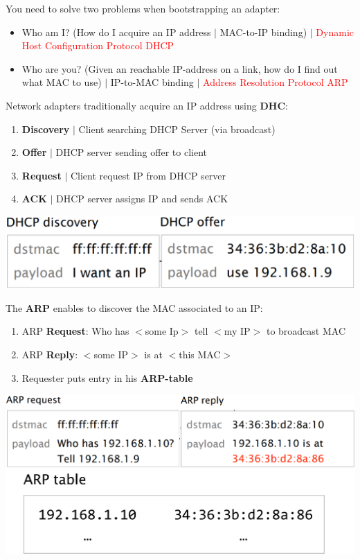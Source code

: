 \documentclass[a4paper, fontsize=8pt, landscape, DIV=1]{scrartcl}
\begin{document}
\begin{multicols*}{4}
\begin{enumerate}[noitemsep]
   			\end{enumerate} 
   			You need to solve two problems when bootstrapping an adapter:
   			\begin{itemize}[noitemsep]
   				\item Who am I? (How do I acquire an IP address $\vert$ MAC-to-IP binding) $\vert$ \textcolor{Red}{Dynamic Host Configuration Protocol DHCP}
   				\item Who are you? (Given an reachable IP-address on a link, how do I find out what MAC to use) $\vert$ IP-to-MAC binding $\vert$ \textcolor{Red}{Address Resolution Protocol ARP}
   			\end{itemize}
   			Network adapters traditionally acquire an IP address using \textbf{DHC}:
   			\begin{enumerate}[noitemsep]
   				\item \textbf{Discovery} $\vert$ Client searching DHCP Server (via broadcast)
   				\item \textbf{Offer} $\vert$ DHCP server sending offer to client
   				\item \textbf{Request} $\vert$ Client request IP from DHCP server
   				\item \textbf{ACK} $\vert$ DHCP server assigns IP and sends ACK 
   			\end{enumerate}
   			\includegraphics[width=\columnwidth]{images/Link_Layer/DHCP.png}
   			\par 
   			
   			The \textbf{ARP} enables to discover the MAC associated to an IP: 
   			\begin{enumerate}[noitemsep]
   				\item ARP \textbf{Request}: Who has $<$some Ip$>$ tell $<$my IP$>$ to broadcast MAC
   				\item ARP \textbf{Reply}: $<$some IP$>$ is at $<$this MAC$>$
   				\item Requester puts entry in his \textbf{ARP-table}
   			\end{enumerate}
   			\includegraphics[width=\columnwidth]{images/Link_Layer/ARP.png}
   			

\end{multicols*}
\end{document}
